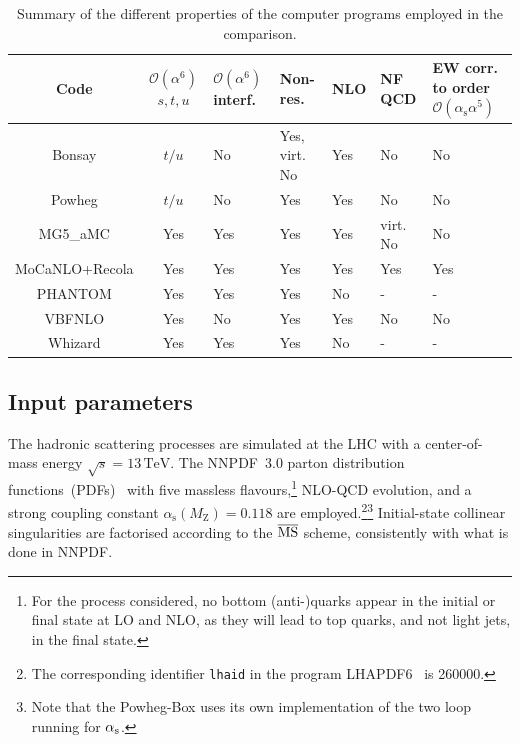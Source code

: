 \documentclass[twocolumn,epjc3]{svjour3} %
\newcommand{\PZ}{\ensuremath{\text{Z}}\xspace}
\newcommand{\MZ}{\ensuremath{M_\PZ}\xspace}
\newcommand{\TeV}{\ensuremath{\,\text{TeV}}\xspace}
\newcommand{\alphas}{\ensuremath{\alpha_\text{s}}\xspace}
\newlength{\width}
\begin{document}
    \begin{table}[ht!]
        \footnotesize
        \begin{tabularx}{\textwidth}{c|c|X|X|X|X|X}
            Code  &  $\mathcal O(\alpha^6)$ $s, t, u$  &  $\mathcal O(\alpha^6)$ interf.  &  Non-res.  & NLO &  NF QCD  &  EW corr. to order $\mathcal O(\alphas \alpha^5)$  \\
            \hline
            \hline
            {\sc Bonsay}        &  $t/u$    &  No       &  Yes, virt. No    &  Yes   & No       &  No  \\
            {\sc Powheg}        &  $t/u$    &  No       &  Yes              &  Yes   & No       &  No  \\
            {\sc MG5\_aMC}      &  Yes      &  Yes      &  Yes              &  Yes   & virt. No &  No \\
            {\sc MoCaNLO+Recola}&  Yes      &  Yes      &  Yes              &  Yes   & Yes      &  Yes  \\
            {\sc PHANTOM}       &  Yes      &  Yes      &  Yes              &  No    & -        & - \\
            {\sc VBFNLO}        &  Yes      &  No       &  Yes              &  Yes   & No       &  No  \\
            {\sc Whizard}       &  Yes      &  Yes      &  Yes              &  No    & -        & - \\
        \end{tabularx}
        \caption{\label{tab:wg1_codes} Summary of the different properties of the computer programs employed in the comparison.}
    \end{table}
    \subsection{Input parameters}
        \label{subsec:inputpar}
    The hadronic scattering processes are simulated at the LHC with a center-of-mass energy $\sqrt s = 13 \TeV$.
    The NNPDF~3.0 parton distribution functions~(PDFs)~\cite{Ball:2014uwa} with five massless flavours,\footnote{For the process considered, no bottom (anti-)quarks appear in the initial or final state at LO and NLO, as they will lead to top quarks, and not light jets, in the final state.} 
    NLO-QCD evolution, and a strong coupling constant $\alphas\left( \MZ \right) = 0.118$ are employed.\footnote{The corresponding identifier {\tt lhaid} in the program LHAPDF6~\cite{Buckley:2014ana} is 260000.}\footnote{Note that the {\sc Powheg-Box} uses its own implementation of the two loop running for $\alpha_{\rm s}$.}
    Initial-state collinear singularities are factorised according to the ${\overline{\rm MS}}$ scheme, consistently with what is done in NNPDF.
\end{document}
